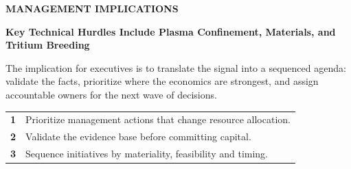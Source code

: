 \documentclass[10pt,a4paper]{article}
\begin{document}
\vspace{6pt}{\textcolor{BOBlue}{\scriptsize\bfseries STRATEGIC POSITIONING MAP}}\par
\begin{center}
\end{center}

\clearpage
{\textcolor{BOBlue}{\scriptsize\bfseries MANAGEMENT IMPLICATIONS}}\par\vspace{-1pt}
{\Large\sffamily\bfseries\color{BONavy} Key Technical Hurdles Include Plasma Confinement, Materials, and Tritium Breeding}\par\vspace{4pt}
{\small The implication for executives is to translate the signal into a sequenced agenda: validate the facts, prioritize where the economics are strongest, and assign accountable owners for the next wave of decisions.}\par
\begin{tabularx}{\linewidth}{p{10mm}Y}
\textcolor{BOBlue}{\bfseries 1} & Prioritize management actions that change resource allocation. \\[5pt]
\textcolor{BOBlue}{\bfseries 2} & Validate the evidence base before committing capital. \\[5pt]
\textcolor{BOBlue}{\bfseries 3} & Sequence initiatives by materiality, feasibility and timing. \\[5pt]
\end{tabularx}
\vspace{6pt}
\end{document}
